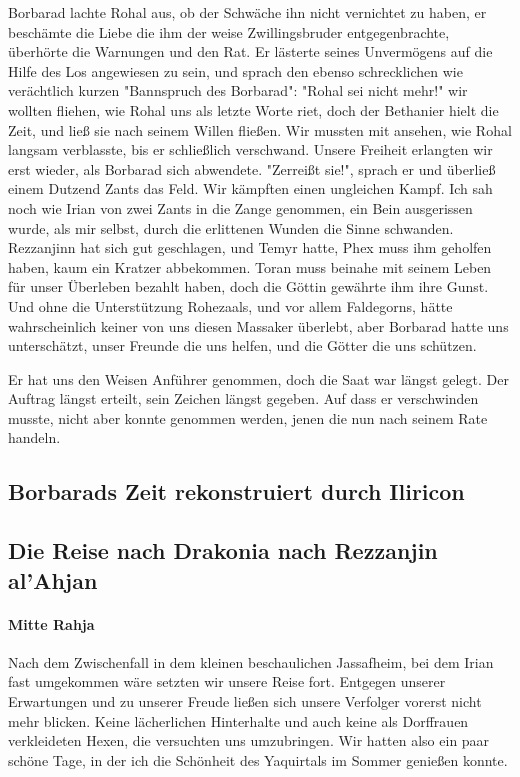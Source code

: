 Borbarad lachte Rohal aus, ob der Schwäche ihn nicht vernichtet zu haben, er beschämte die Liebe die ihm der weise Zwillingsbruder entgegenbrachte, überhörte die Warnungen und den Rat. Er lästerte seines Unvermögens auf die Hilfe des Los angewiesen zu sein, und sprach den ebenso schrecklichen wie verächtlich kurzen "Bannspruch des Borbarad": "Rohal sei nicht mehr!" wir wollten fliehen, wie Rohal uns als letzte Worte riet, doch der Bethanier hielt die Zeit, und ließ sie nach seinem Willen fließen. Wir mussten mit ansehen, wie Rohal langsam verblasste, bis er schließlich verschwand. Unsere Freiheit erlangten wir erst wieder, als Borbarad sich abwendete. "Zerreißt sie!", sprach er und überließ einem Dutzend Zants das Feld. Wir kämpften einen ungleichen Kampf. Ich sah noch wie Irian von zwei Zants in die Zange genommen, ein Bein ausgerissen wurde, als mir selbst, durch die erlittenen Wunden die Sinne schwanden. Rezzanjinn hat sich gut geschlagen, und Temyr hatte, Phex muss ihm geholfen haben, kaum ein Kratzer abbekommen. Toran muss beinahe mit seinem Leben für unser Überleben bezahlt haben, doch die Göttin gewährte ihm ihre Gunst. Und ohne die Unterstützung Rohezaals, und vor allem Faldegorns, hätte wahrscheinlich keiner von uns diesen Massaker überlebt, aber Borbarad hatte uns unterschätzt, unser Freunde die uns helfen, und die Götter die uns schützen.

Er hat uns den Weisen Anführer genommen, doch die Saat war längst gelegt. Der Auftrag längst erteilt, sein Zeichen längst gegeben. Auf dass er verschwinden musste, nicht aber konnte genommen werden, jenen die nun nach seinem Rate handeln.

\subsection{Borbarads Zeit rekonstruiert durch Iliricon}

{\itshape

}

\subsection{Die Reise nach Drakonia nach Rezzanjin al'Ahjan}

\paragraph{Mitte Rahja}
Nach dem Zwischenfall in dem kleinen beschaulichen Jassafheim, bei dem Irian fast umgekommen wäre setzten wir unsere Reise fort. Entgegen unserer Erwartungen und zu unserer Freude ließen sich unsere Verfolger vorerst nicht mehr blicken. Keine lächerlichen Hinterhalte und auch keine als Dorffrauen verkleideten Hexen, die versuchten uns umzubringen. Wir hatten also ein paar schöne Tage, in der ich die Schönheit des Yaquirtals im Sommer genießen konnte.

